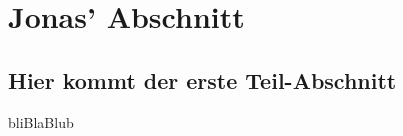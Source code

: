 \section{Jonas' Abschnitt}\label{Jonas}
\subsection{Hier kommt der erste Teil-Abschnitt }
bliBlaBlub